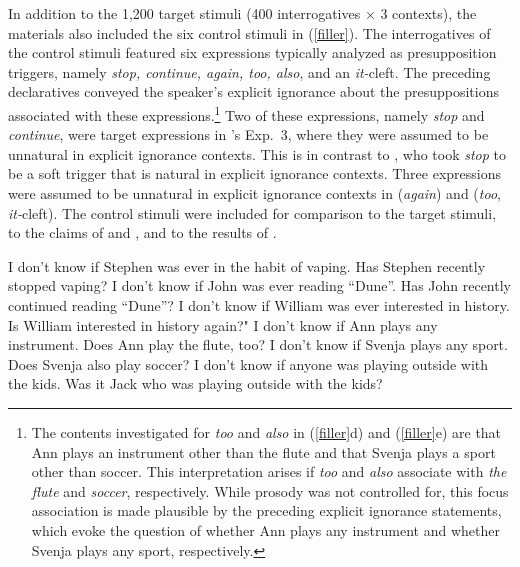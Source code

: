 \documentclass[11pt,fleqn]{article}
\newcommand{\6}{\mbox{$[\hspace*{-.6mm}[$}}
\newcommand{\9}{\mbox{$]\hspace*{-.6mm}]$}}
\newcommand{\citepos}[1]{\citeauthor{#1}'s \citeyear{#1}}
\begin{document}
In addition to the 1,200 target stimuli (400 interrogatives $\times$ 3 contexts), the materials also included the six control stimuli in (\ref{filler}). The interrogatives of the control stimuli featured six expressions typically analyzed as presupposition triggers, namely {\em stop, continue, again, too, also}, and an {\em it-}cleft. The preceding declaratives conveyed the speaker's explicit ignorance about the presuppositions associated with these expressions.\footnote{The contents investigated for {\em too} and {\em also} in (\ref{filler}d) and (\ref{filler}e) are that Ann plays an instrument other than the flute and that Svenja plays a sport other than soccer. This interpretation arises if {\em too} and {\em also} associate with {\em the flute} and {\em soccer}, respectively. While prosody was not controlled for, this focus association is made plausible by the preceding explicit ignorance statements, which evoke the question of whether Ann plays any instrument and whether Svenja plays any sport, respectively.} Two of these expressions, namely {\em stop} and {\em continue}, were target expressions in \citepos{mandelkern-etal2020} Exp.~3, where they were assumed to be unnatural in explicit ignorance contexts. This is in contrast to \citealt{simons01}, who took {\em stop} to be a soft trigger that is natural in explicit ignorance contexts. Three expressions were assumed to be unnatural in explicit ignorance contexts in \citealt{simons01} ({\em again}) and \citealt{abusch10} ({\em too}, {\em it-}cleft). The control stimuli were included for comparison to the target stimuli, to the claims of \citealt{simons01} and \citealt{abusch10}, and to the results of \citealt{mandelkern-etal2020}.

\begin{exe}
\ex\label{filler} 
\begin{xlist}
\ex I don't know if Stephen was ever in the habit of vaping. Has Stephen recently stopped vaping?
\ex I don't know if John was ever reading ``Dune''. Has John recently continued reading ``Dune''?
\ex I don't know if William was ever interested in history. Is William interested in history again?"
\ex I don't know if Ann plays any instrument. Does Ann play the flute, too?
\ex I don't know if Svenja plays any sport. Does Svenja also play soccer?
\ex I don't know if anyone was playing outside with the kids. Was it Jack who was playing outside with the kids?

\end{xlist}
\end{exe}
\end{document}
